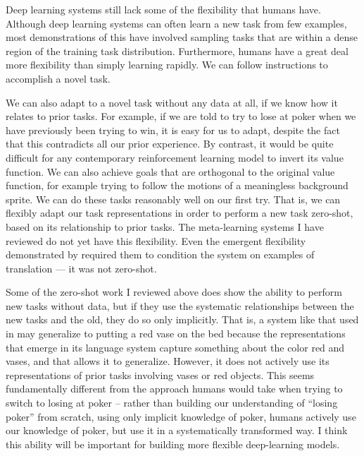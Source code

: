 Deep learning systems still lack some of the flexibility that humans have. Although deep learning systems can often learn a new task from few examples, most demonstrations of this have involved sampling tasks that are within a dense region of the training task distribution. Furthermore, humans have a great deal more flexibility than simply learning rapidly. We can follow instructions to accomplish a novel task. \par
We can also adapt to a novel task without any data at all, if we know how it relates to prior tasks. For example, if we are told to try to lose at poker when we have previously been trying to win, it is easy for us to adapt, despite the fact that this contradicts all our prior experience. By contrast, it would be quite difficult for any contemporary reinforcement learning model to invert its value function. We can also achieve goals that are orthogonal to the original value function, for example trying to follow the motions of a meaningless background sprite. We can do these tasks reasonably well on our first try. That is, we can flexibly adapt our task representations in order to perform a new task zero-shot, based on its relationship to prior tasks. The meta-learning systems I have reviewed do not yet have this flexibility. Even the emergent flexibility demonstrated by \citet{Radford2019} required them to condition the system on examples of translation --- it was not zero-shot. \par
Some of the zero-shot work I reviewed above does show the ability to perform new tasks without data, but if they use the systematic relationships between the new tasks and the old, they do so only implicitly. That is, a system like that used in \citet{Hill2019a} may generalize to putting a red vase on the bed because the representations that emerge in its language system capture something about the color red and vases, and that allows it to generalize. However, it does not actively use its representations of prior tasks involving vases or red objects. This seems fundamentally different from the approach humans would take when trying to switch to losing at poker -- rather than building our understanding of ``losing poker'' from scratch, using only implicit knowledge of poker, humans actively use our knowledge of poker, but use it in a systematically transformed way. I think this ability will be important for building more flexible deep-learning models.  \par

